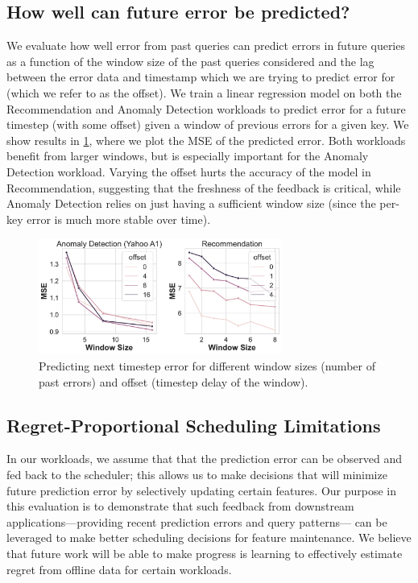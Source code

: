 \subsection{How well can future error be predicted?}
We evaluate how well error from past queries can predict errors in future queries as a function of the window size of the past queries considered and the lag between the error data and timestamp which we are trying to predict error for (which we refer to as the offset). We train a linear regression model on both the Recommendation and Anomaly Detection workloads to predict error for a future timestep (with some offset) given a window of previous errors for a given key. We show results in \cref{fig:predict_error}, where we plot the MSE of the predicted error. Both workloads benefit from larger windows, but is especially important for the Anomaly Detection workload. Varying the offset hurts the accuracy of the model in Recommendation, suggesting that the freshness of the feedback is critical, while Anomaly Detection relies on just having a sufficient window size (since the per-key error is much more stable over time). 


\begin{figure}
    \centering
    \includegraphics[width=8cm]{ralf/figures/predict_error.pdf}
    \caption{Predicting next timestep error for different window sizes (number of past errors) and offset (timestep delay of the window).}
    \label{fig:predict_error}
\end{figure}


\subsection{Regret-Proportional Scheduling Limitations}
In our workloads, we assume that that the prediction error can be observed and fed back to the scheduler; this allows us to make decisions that will minimize future prediction error by selectively updating certain features. Our purpose in this evaluation is to demonstrate that such feedback from downstream applications---providing recent prediction errors and query patterns--- can be leveraged to make better scheduling decisions for feature maintenance. We believe that future work will be able to make progress is learning to effectively estimate regret from offline data for certain workloads.

